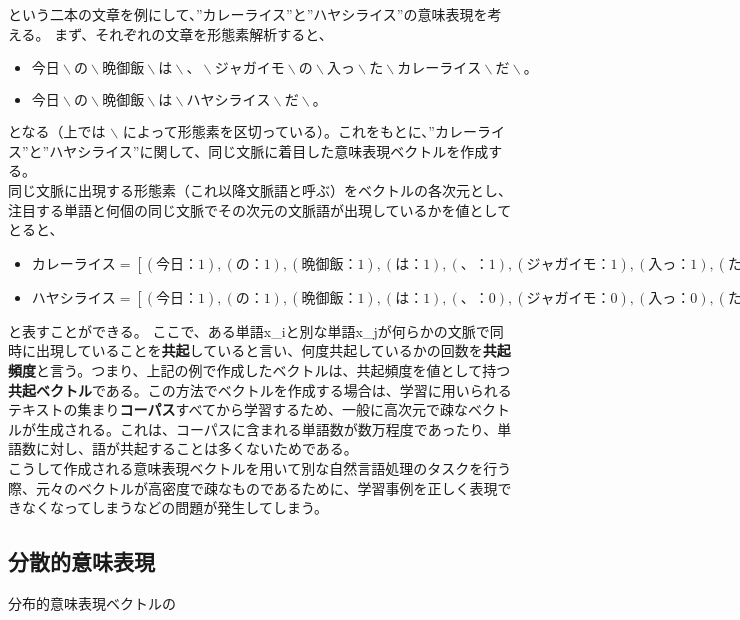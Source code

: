 という二本の文章を例にして、”カレーライス”と”ハヤシライス”の意味表現を考える。
まず、それぞれの文章を形態素解析すると、

\begin{itemize}
  \item $今日 \backslash の \backslash 晩御飯 \backslash は \backslash 、 \backslash ジャガイモ \backslash の \backslash 入っ \backslash た \backslash カレーライス \backslash だ \backslash 。$

  \item $今日 \backslash の \backslash 晩御飯 \backslash は \backslash ハヤシライス \backslash だ \backslash 。$
\end{itemize}

となる（上では $\backslash$ によって形態素を区切っている）。これをもとに、”カレーライス”と”ハヤシライス”に関して、同じ文脈に着目した意味表現ベクトルを作成する。\\
同じ文脈に出現する形態素（これ以降文脈語と呼ぶ）をベクトルの各次元とし、注目する単語と何個の同じ文脈でその次元の文脈語が出現しているかを値としてとると、

\begin{itemize}
  \label{weight_equation}
  \item $カレーライス = [(今日：1),(の：1),(晩御飯：1),(は：1),(、：1),(ジャガイモ：1),(入っ：1),(た：1),(だ：1),(。：1)]$
  \item $ハヤシライス = [(今日：1),(の：1),(晩御飯：1),(は：1),(、：0),(ジャガイモ：0),(入っ：0),(た：0),(だ：1),(。：1)]$
\end{itemize}

と表すことができる。
ここで、ある単語x_iと別な単語x_jが何らかの文脈で同時に出現していることを\textbf{共起}していると言い、何度共起しているかの回数を\textbf{共起頻度}と言う。つまり、上記の例で作成したベクトルは、共起頻度を値として持つ\textbf{共起ベクトル}である。この方法でベクトルを作成する場合は、学習に用いられるテキストの集まり\textbf{コーパス}すべてから学習するため、一般に高次元で疎なベクトルが生成される。これは、コーパスに含まれる単語数が数万程度であったり、単語数に対し、語が共起することは多くないためである。\\

こうして作成される意味表現ベクトルを用いて別な自然言語処理のタスクを行う際、元々のベクトルが高密度で疎なものであるために、学習事例を正しく表現できなくなってしまうなどの問題が発生してしまう。

\subsection{分散的意味表現}
分布的意味表現ベクトルの
